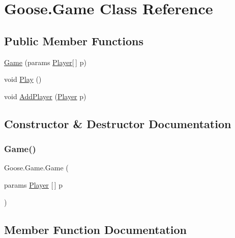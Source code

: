 \hypertarget{class_goose_1_1_game}{}\section{Goose.\+Game Class Reference}
\label{class_goose_1_1_game}
\subsection*{Public Member Functions}
\begin{DoxyCompactItemize}
\item 
\hyperlink{class_goose_1_1_game_a48ddd41452fe36c2d732ae2a9d9bceb2}{Game} (params \hyperlink{class_goose_1_1_player}{Player}\mbox{[}$\,$\mbox{]} p)
\item 
void \hyperlink{class_goose_1_1_game_aa957321a949b4dc204cf16365370a7f5}{Play} ()
\item 
void \hyperlink{class_goose_1_1_game_acff8080cbe0391c0e7e8b9b47160cd16}{Add\+Player} (\hyperlink{class_goose_1_1_player}{Player} p)
\end{DoxyCompactItemize}


\subsection{Constructor \& Destructor Documentation}
\mbox{\label{class_goose_1_1_game_a48ddd41452fe36c2d732ae2a9d9bceb2}} 
\subsubsection{\texorpdfstring{Game()}{Game()}}
{\footnotesize\ttfamily Goose.\+Game.\+Game (\begin{DoxyParamCaption}\item[{params \hyperlink{class_goose_1_1_player}{Player} \mbox{[}$\,$\mbox{]}}]{p }\end{DoxyParamCaption})}



\subsection{Member Function Documentation}
\mbox{\label{class_goose_1_1_game_acff8080cbe0391c0e7e8b9b47160cd16}} 
